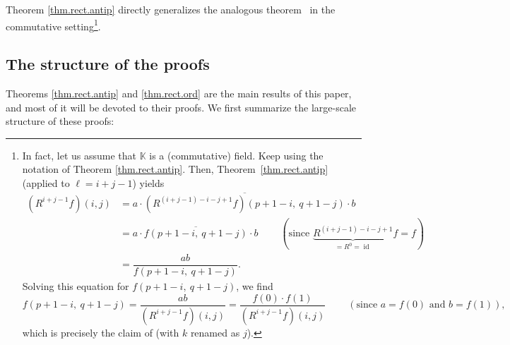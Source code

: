 \documentclass[numbers=enddot,12pt,final,onecolumn,notitlepage]{scrartcl}%
\theoremstyle{definition}
\newenvironment{verlong}{}{}
\DeclareMathOperator{\id}{id}
\begin{document}
\begin{verlong}
Theorem \ref{thm.rect.antip} directly generalizes the analogous
theorem~\cite[Theorem 11.7]{bir-row-arxiv} in the commutative
setting\footnote{In fact, let us assume that $\mathbb{K}$ is a (commutative)
field. Keep using the notation of Theorem \ref{thm.rect.antip}. Then,
Theorem~\ref{thm.rect.antip} (applied to $\ell=i+j-1$) yields%
\begin{align*}
\left(  R^{i+j-1}f\right)  \left(  i,j\right)   &  =a\cdot\overline{\left(
R^{\left(  i+j-1\right)  -i-j+1}f\right)  \left(  p+1-i,\ q+1-j\right)  }\cdot
b\\
&  =a\cdot\overline{f\left(  p+1-i,\ q+1-j\right)  }\cdot
b\ \ \ \ \ \ \ \ \ \ \left(  \text{since }\underbrace{R^{\left(  i+j-1\right)
-i-j+1}}_{=R^{0}=\id}f=f\right) \\
&  =\dfrac{ab}{f\left(  p+1-i,\ q+1-j\right)  }.
\end{align*}
Solving this equation for $f\left(  p+1-i,\ q+1-j\right)  $, we find%
\[
f\left(  p+1-i,\ q+1-j\right)  =\dfrac{ab}{\left(  R^{i+j-1}f\right)  \left(
i,j\right)  }=\dfrac{f\left(  0\right)  \cdot f\left(  1\right)  }{\left(
R^{i+j-1}f\right)  \left(  i,j\right)  }\ \ \ \ \ \ \ \ \ \ \left(
\text{since $a=f\left(  0\right)  $ and $b=f\left(  1\right)  $}\right)  ,
\]
which is precisely the claim of \cite[Theorem 11.7]{bir-row-arxiv} (with $k$
renamed as $j$).}.
\end{verlong}

\subsection{The structure of the proofs}

Theorems \ref{thm.rect.antip} and \ref{thm.rect.ord} are the main results of
this paper, and most of it will be devoted to their proofs. We first summarize
the large-scale structure of these proofs:
\end{document}
